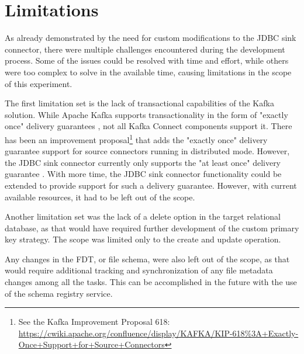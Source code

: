 
\section{Limitations}
\label{ch04:pipelinedevelopment:solutionlimitations}
As already demonstrated by the need for custom modifications to the \ac{JDBC} sink connector, there were multiple challenges encountered during the development process. Some of the issues could be resolved with time and effort, while others were too complex to solve in the available time, causing limitations in the scope of this experiment.

The first limitation set is the lack of transactional capabilities of the Kafka solution. While Apache Kafka supports transactionality in the form of "exactly once" delivery guarantees \cite{kafkadocumentation}, not all Kafka Connect components support it. There has been an improvement proposal\footnote{See the Kafka Improvement Proposal 618: \url{https://cwiki.apache.org/confluence/display/KAFKA/KIP-618\%3A+Exactly-Once+Support+for+Source+Connectors}} that adds the "exactly once" delivery guarantee support for source connectors running in distributed mode. However, the \ac{JDBC} sink connector currently only supports the "at least once" delivery guarantee \cite{jdbcsinkdocumentation}. With more time, the \ac{JDBC} sink connector functionality could be extended to provide support for such a delivery guarantee. However, with current available resources, it had to be left out of the scope.

Another limitation set was the lack of a delete option in the target relational database, as that would have required further development of the custom primary key strategy. The scope was limited only to the create and update operation.

Any changes in the \ac{FDT}, or file schema, were also left out of the scope, as that would require additional tracking and synchronization of any file metadata changes among all the tasks. This can be accomplished in the future with the use of the schema registry service.

